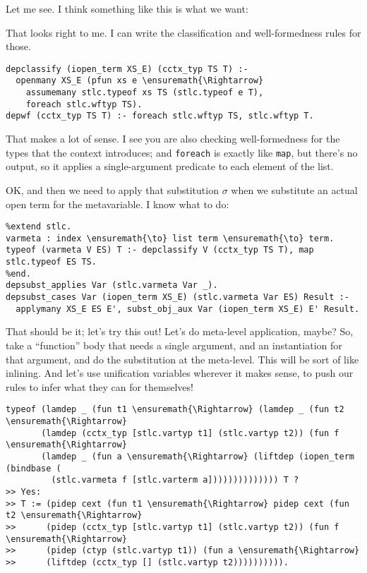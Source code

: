 

\heroSTUDENT{} Let me see. I think something like this is what we want:

\heroADVISOR{} That looks right to me. I can write the classification and
well-formedness rules for those.

\begin{verbatim}
depclassify (iopen_term XS_E) (cctx_typ TS T) :-
  openmany XS_E (pfun xs e \ensuremath{\Rightarrow}
    assumemany stlc.typeof xs TS (stlc.typeof e T),
    foreach stlc.wftyp TS).
depwf (cctx_typ TS T) :- foreach stlc.wftyp TS, stlc.wftyp T.
\end{verbatim}

\heroSTUDENT{} That makes a lot of sense. I see you are also checking
well-formedness for the types that the context introduces; and
\texttt{foreach} is exactly like \texttt{map}, but there's no output, so
it applies a single-argument predicate to each element of the list.

\heroSTUDENT{} OK, and then we need to apply that substitution \(\sigma\) when
we substitute an actual open term for the metavariable. I know what to
do:

\vspace{-0.5em}

\begin{verbatim}
%extend stlc.
varmeta : index \ensuremath{\to} list term \ensuremath{\to} term.
typeof (varmeta V ES) T :- depclassify V (cctx_typ TS T), map stlc.typeof ES TS.
%end.
depsubst_applies Var (stlc.varmeta Var _).
depsubst_cases Var (iopen_term XS_E) (stlc.varmeta Var ES) Result :-
  applymany XS_E ES E', subst_obj_aux Var (iopen_term XS_E) E' Result.
\end{verbatim}

\heroADVISOR{} That should be it; let's try this out! Let's do meta-level
application, maybe? So, take a ``function'' body that needs a single
argument, and an instantiation for that argument, and do the
substitution at the meta-level. This will be sort of like inlining. And
let's use unification variables wherever it makes sense, to push our
rules to infer what they can for themselves!

\begin{verbatim}
typeof (lamdep _ (fun t1 \ensuremath{\Rightarrow} (lamdep _ (fun t2 \ensuremath{\Rightarrow}
       (lamdep (cctx_typ [stlc.vartyp t1] (stlc.vartyp t2)) (fun f \ensuremath{\Rightarrow}
       (lamdep _ (fun a \ensuremath{\Rightarrow} (liftdep (iopen_term (bindbase (
         (stlc.varmeta f [stlc.varterm a]))))))))))))) T ?
>> Yes:
>> T := (pidep cext (fun t1 \ensuremath{\Rightarrow} pidep cext (fun t2 \ensuremath{\Rightarrow}
>>      (pidep (cctx_typ [stlc.vartyp t1] (stlc.vartyp t2)) (fun f \ensuremath{\Rightarrow}
>>      (pidep (ctyp (stlc.vartyp t1)) (fun a \ensuremath{\Rightarrow}
>>      (liftdep (cctx_typ [] (stlc.vartyp t2)))))))))).
\end{verbatim}

